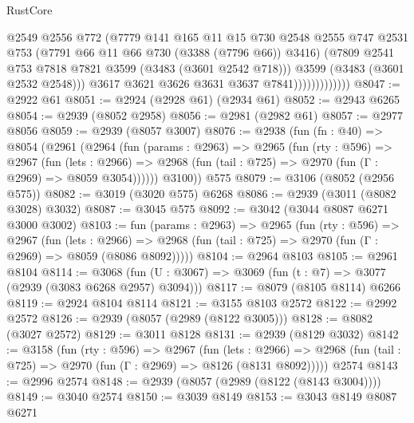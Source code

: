 \begin{lexlean}{RustCore}
\begin{coremodule}
                              @2549
                              @2556
                              @772
                              (@7779
                                @141
                                @165
                                @11
                                @15
                                @730
                                @2548
                                @2555
                                @747
                                @2531
                                @753
                                (@7791 @66 @11 @66 @730 (@3388 (@7796 @66)) @3416)
                                (@7809 @2541 @753 @7818 @7821 @3599 (@3483 (@3601 @2542 @718)))
                                @3599
                                (@3483 (@3601 @2532 @2548)))
                              @3617
                              @3621
                              @3626
                              @3631
                              @3637
                              @7841)))))))))))))
@8047 := @2922 @61
@8051 := @2924 (@2928 @61) (@2934 @61)
@8052 := @2943 @6265
@8054 := @2939 (@8052 @2958)
@8056 := @2981 (@2982 @61)
@8057 := @2977 @8056
@8059 := @2939 (@8057 @3007)
@8076 := @2938
    (fun (fn : @40) =>
    @8054
      (@2961
        (@2964
          (fun (params : @2963) =>
          @2965
            (fun (rty : @596) =>
            @2967
              (fun (lets : @2966) =>
              @2968 (fun (tail : @725) => @2970 (fun (Γ : @2969) => @8059 @3054))))))
        @3100))
    @575
@8079 := @3106 (@8052 (@2956 @575))
@8082 := @3019 (@3020 @575) @6268
@8086 := @2939 (@3011 (@8082 @3028) @3032)
@8087 := @3045 @575
@8092 := @3042 (@3044 @8087 @6271 @3000 @3002)
@8103 := fun (params : @2963) =>
  @2965
    (fun (rty : @596) =>
    @2967
      (fun (lets : @2966) =>
      @2968 (fun (tail : @725) => @2970 (fun (Γ : @2969) => @8059 (@8086 @8092)))))
@8104 := @2964 @8103
@8105 := @2961 @8104
@8114 := @3068 (fun (U : @3067) => @3069 (fun (t : @7) => @3077 (@2939 (@3083 @6268 @2957) @3094)))
@8117 := @8079 (@8105 @8114) @6266
@8119 := @2924 @8104 @8114
@8121 := @3155 @8103 @2572
@8122 := @2992 @2572
@8126 := @2939 (@8057 (@2989 (@8122 @3005)))
@8128 := @8082 (@3027 @2572)
@8129 := @3011 @8128
@8131 := @2939 (@8129 @3032)
@8142 := @3158
    (fun (rty : @596) =>
    @2967
      (fun (lets : @2966) =>
      @2968 (fun (tail : @725) => @2970 (fun (Γ : @2969) => @8126 (@8131 @8092)))))
    @2574
@8143 := @2996 @2574
@8148 := @2939 (@8057 (@2989 (@8122 (@8143 @3004))))
@8149 := @3040 @2574
@8150 := @3039 @8149
@8153 := @3043 @8149 @8087 @6271

\end{coremodule}
\end{lexlean}
